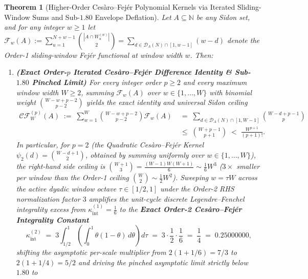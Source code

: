 \documentclass[11pt,reqno]{amsart}
\newtheorem{theorem}{Theorem}[section]
\theoremstyle{definition}
\theoremstyle{remark}
\begin{document}
\begin{theorem}[Higher-Order Ces\`aro--Fej\'er Polynomial Kernels via Iterated Sliding-Window Sums and Sub-$1.80$ Envelope Deflation]\label{thm:cesaro_fejer_order2}
Let $A \subseteq \mathbb{N}$ be any Sidon set, and for any integer $w \ge 1$ let $\mathcal{F}_w(A) := \sum_{u=1}^{N+w-1} \binom{|A \cap W_u^{(w)}|}{2} = \sum_{d \in \mathcal{D}_A(N)\cap[1,w-1]} (w - d)$ denote the Order-1 sliding-window Fej\'er functional at window width $w$. Then:
\begin{enumerate}
  \item[\textup{(a)}] \textbf{(Exact Order-$p$ Iterated Ces\`aro--Fej\'er Difference Identity \& Sub-$1.80$ Pinched Limit)} For every integer order $p \ge 2$ and every maximum window width $W \ge 2$, summing $\mathcal{F}_w(A)$ over $w \in \{1, \dots, W\}$ with binomial weight $\binom{W - w + p - 2}{p - 2}$ yields the exact identity and universal Sidon ceiling
  \begin{equation}\label{eq:cesaro_fejer_order_p}
    \begin{aligned}
      \mathcal{CF}_W^{(p)}(A) \;:=\; \sum_{w=1}^W \binom{W - w + p - 2}{p - 2} \mathcal{F}_w(A) &\;=\; \sum_{d \in \mathcal{D}_A(N) \cap [1, W - 1]} \binom{W - d + p - 1}{p} \\
      &\;\le\; \binom{W + p - 1}{p + 1} \;<\; \frac{W^{p+1}}{(p + 1)!}.
    \end{aligned}
  \end{equation}
  In particular, for $p = 2$ (the Quadratic Ces\`aro--Fej\'er Kernel $\psi_2(d) = \binom{W - d + 1}{2}$, obtained by summing uniformly over $w \in \{1, \dots, W\}$), the right-hand side ceiling is $\binom{W + 1}{3} = \frac{(W-1)W(W+1)}{6} \sim \frac{1}{6}W^3$ ($3\times$ smaller per window than the Order-1 ceiling $\binom{W}{2} \sim \frac{1}{2}W^2$). Sweeping $w = \tau W$ across the active dyadic window octave $\tau \in [1/2, 1]$ under the Order-2 RHS normalization factor $3$ amplifies the unit-cycle discrete Legendre--Fenchel integrality excess from $\kappa_{\mathrm{int}}^{(1)} = \frac{1}{6}$ to the \textbf{Exact Order-2 Ces\`aro--Fej\'er Integrality Constant}
  \begin{equation}\label{eq:kappa_int_order2}
    \kappa_{\mathrm{int}}^{(2)} \;=\; 3 \int_{1/2}^1 \left(\int_0^1 \theta(1 - \theta)\,d\theta\right) d\tau \;=\; 3 \cdot \frac{1}{2} \cdot \frac{1}{6} \;=\; \frac{1}{4} \;=\; 0.25000000,
  \end{equation}
  shifting the asymptotic per-scale multiplier from $2(1 + 1/6) = 7/3$ to $2(1 + 1/4) = 5/2$ and driving the pinched asymptotic limit strictly below $1.80$ to

\end{enumerate}
\end{theorem}
\end{document}
